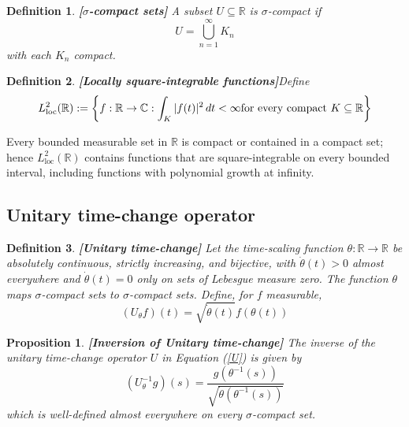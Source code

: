 \documentclass{article}
\newcommand{\assign}{:=}
\newcommand{\tmop}[1]{\ensuremath{\operatorname{#1}}}
\newcommand{\tmstrong}[1]{\textbf{#1}}
\newtheorem{definition}{Definition}
\newtheorem{proposition}{Proposition}
{\theorembodyfont{\rmfamily}\newtheorem{remark}{Remark}}
\begin{document}
\begin{definition}
  {\tmstrong{[$\sigma$-compact sets]\label{def:sigma_compact}}} A subset $U
  \subseteq \mathbb{R}$ is $\sigma$-compact if
  \begin{equation}
    U = \bigcup_{n = 1}^{\infty} K_n
  \end{equation}
  with each $K_n$ compact.
\end{definition}

\begin{definition}
  {\tmstrong{[Locally square-integrable functions]}}\label{def:L2loc} Define
  \begin{equation}
    L^2_{\tmop{loc}} (\mathbb{R}) \assign \left\{ f : \mathbb{R} \to
    \mathbb{C}: \int_K |f (t) |^2  \hspace{0.17em} dt < \infty \text{for every
    compact } K \subseteq \mathbb{R} \right\}
  \end{equation}
\end{definition}

\begin{remark}
  Every bounded measurable set in $\mathbb{R}$ is compact or contained in a
  compact set; hence $L^2_{\tmop{loc}} (\mathbb{R})$ contains functions that
  are square-integrable on every bounded interval, including functions with
  polynomial growth at infinity.
\end{remark}

\subsection{Unitary time-change operator}

\begin{definition}
  {\tmstrong{[Unitary time-change]\label{def:Utheta}}} Let the time-scaling
  function $\theta : \mathbb{R} \to \mathbb{R}$ be absolutely continuous,
  strictly increasing, and bijective, with $\dot{\theta} (t) > 0$ almost
  everywhere and $\dot{\theta} (t) = 0$ only on sets of Lebesgue measure zero.
  The function $\theta$ maps $\sigma$-compact sets to $\sigma$-compact sets.
  Define, for $f$ measurable,
  \begin{equation}
    (U_{\theta} f) (t) = \sqrt{\dot{\theta} (t)} f (\theta (t)) \label{U}
  \end{equation}
\end{definition}

\begin{proposition}
  {\tmstrong{[Inversion of Unitary time-change]\label{prop:inverse} }}The
  inverse of the unitary time-change operator $U$ in Equation (\ref{U}) is
  given by
  \begin{equation}
    (U_{\theta}^{- 1} g) (s) = \frac{g (\theta^{- 1} (s))}{\sqrt{\dot{\theta}
    (\theta^{- 1} (s))}}
  \end{equation}
  which is well-defined almost everywhere on every $\sigma$-compact set.
\end{proposition}
\end{document}
